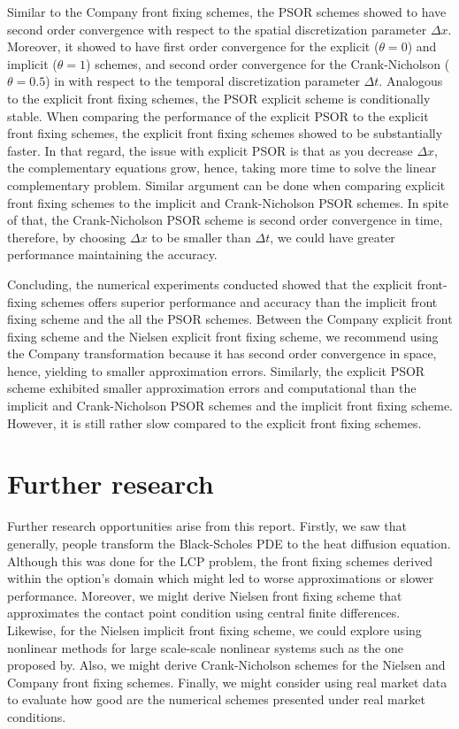Similar to the Company front fixing schemes, the PSOR schemes showed to have second order convergence with respect to the spatial discretization parameter $\Delta{x}$. Moreover, it showed to have first order convergence for the explicit ($\theta=0$) and implicit ($\theta=1$) schemes, and second order convergence for the Crank-Nicholson ($\theta=0.5$) in with respect to the temporal discretization parameter $\Delta{t}$. Analogous to the explicit front fixing schemes, the PSOR explicit scheme is conditionally stable. When comparing the performance of the explicit PSOR to the explicit front fixing schemes, the explicit front fixing schemes showed to be substantially faster. In that regard, the issue with explicit PSOR is that as you decrease $\Delta{x}$, the complementary equations grow, hence, taking more time to solve the linear complementary problem. Similar argument can be done when comparing explicit front fixing schemes to the implicit and Crank-Nicholson PSOR schemes. In spite of that, the Crank-Nicholson PSOR scheme is second order convergence in time, therefore, by choosing $\Delta{x}$ to be smaller than $\Delta{t}$, we could have greater performance maintaining the accuracy. 

Concluding, the numerical experiments conducted showed that the explicit front-fixing schemes offers superior performance and accuracy than the implicit front fixing scheme and the all the PSOR schemes. Between the Company explicit front fixing scheme and the Nielsen explicit front fixing scheme, we recommend using the Company transformation because it has second order convergence in space, hence, yielding to smaller approximation errors. Similarly, the explicit PSOR scheme exhibited smaller approximation errors and computational than the implicit and Crank-Nicholson PSOR schemes and the implicit front fixing scheme. However, it is still rather slow compared to the explicit front fixing schemes.

\section{Further research}

Further research opportunities arise from this report. Firstly, we saw that generally, people transform the Black-Scholes PDE to the heat diffusion equation. Although this was done for the LCP problem, the front fixing schemes derived within the option's domain which might led to worse approximations or slower performance. Moreover, we might derive Nielsen front fixing scheme that approximates the contact point condition using central finite differences. Likewise, for the Nielsen implicit front fixing scheme, we could explore using nonlinear methods for large scale-scale nonlinear systems such as the one proposed by\cite{lacruz_2006}. Also, we might derive Crank-Nicholson schemes for the Nielsen and Company front fixing schemes. Finally, we might consider using real market data to evaluate how good are the numerical schemes presented under real market conditions.
